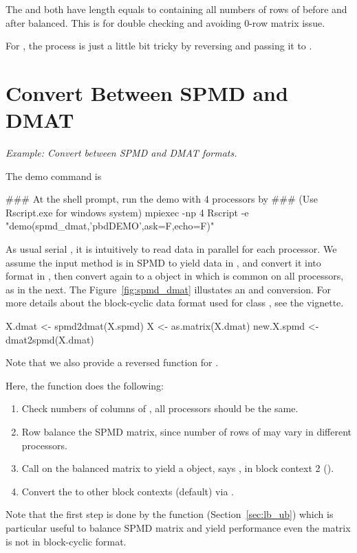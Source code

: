 The  and  both have length equals to
 containing all numbers of rows of 
before and after balanced. This is for double checking and avoiding 0-row
matrix issue.

For , the process is just a little bit tricky by reversing
 and passing it to .






\section{Convert Between SPMD and DMAT}
\label{sec:spmd_dmat}

\emph{Example:  Convert between SPMD and DMAT formats.}

The demo command is
\begin{Command}
### At the shell prompt, run the demo with 4 processors by
### (Use Rscript.exe for windows system)
mpiexec -np 4 Rscript -e "demo(spmd_dmat,'pbdDEMO',ask=F,echo=F)"
\end{Command}

As usual serial , it is intuitively to read data in parallel
for each processor. We assume the input method is in SPMD to yield
data in , and convert it into 
format in , then convert again to a 
object in  which is common on all processors, as in the next.
The Figure~\ref{fig:spmd_dmat} illustates an  and  conversion.  For more details about the block-cyclic data format used for class , see the  vignette.
\begin{Code}[title=R Code]
X.dmat <- spmd2dmat(X.spmd)
X <- as.matrix(X.dmat)
new.X.spmd <- dmat2spmd(X.dmat)
\end{Code}
Note that we also provide a reversed function  for
.

Here, the  function does the following:
\begin{enumerate}
\item Check numbers of columns of , all
      processors should be the same.
\item Row balance the SPMD matrix, since number of rows of
       may vary in different processors.
\item Call  on the balanced matrix to yield a  object,
      says , in block context 2 ().
\item Convert the  to other block contexts
      (default) via .
\end{enumerate}
Note that the first step is done by the  function
(Section~\ref{sec:lb_ub})
which is particular useful to balance SPMD matrix and yield performance
even the matrix is not in block-cyclic format.

